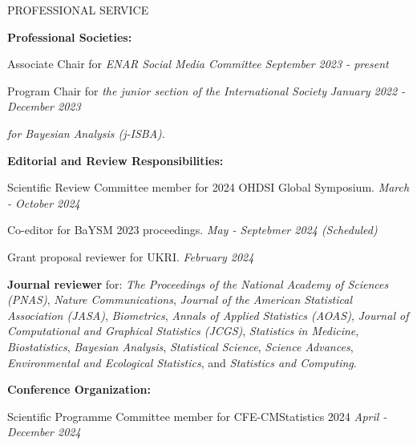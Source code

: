 \documentclass{resume} %
\newcommand{\thisYear}[1]{
	#1
}
\begin{document}
\begin{rSection}{PROFESSIONAL SERVICE}
	
	\hspace*{-0.2in}\textbf{Professional Societies:}
	
	\thisYear{
	Associate Chair for \emph{ENAR Social Media Committee}  \hfill {\em September 2023 - present}
}

		\smallskip
	
	Program Chair for \emph{the junior section of the International Society} \hfill {\em January 2022 - December 2023}
	
	\vspace{-0.1in}
	\emph{for Bayesian Analysis (j-ISBA)}.
	
\medskip 

 \hspace*{-0.2in}\textbf{Editorial and Review Responsibilities:}
 
 	Scientific Review Committee member for 2024 OHDSI Global Symposium. 	\hfill {\em March - October 2024}
 	
 	\smallskip 
	
		\thisYear{
 Co-editor for BaYSM 2023 proceedings.	\hfill {\em May - Septebmer 2024 (Scheduled)}
}

    \smallskip 
    
    	\thisYear{
    Grant proposal reviewer for UKRI.	\hfill {\em February 2024}
}
    
    \smallskip 
    
    \textbf{Journal reviewer} for: \emph{The Proceedings of the National Academy of Sciences (PNAS)}, \emph{Nature Communications}, \emph{Journal of the American Statistical Association (JASA)}, \emph{Biometrics}, \emph{Annals of Applied Statistics (AOAS)}, \emph{Journal of Computational and Graphical Statistics (JCGS)}, \emph{Statistics in Medicine}, \emph{Biostatistics}, \emph{Bayesian Analysis},  \emph{Statistical Science},  \emph{Science Advances}, \emph{Environmental and Ecological Statistics}, and \emph{Statistics and Computing}. 
    
%    
    
    \medskip 

 \hspace*{-0.2in}\textbf{Conference Organization:}
 
 	\thisYear{
 Scientific Programme Committee member for CFE-CMStatistics 2024 \hfill {\em April - December 2024}
}
 

\end{rSection}
\end{document}

